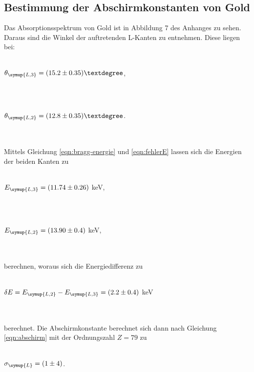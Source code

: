         \subsection{Bestimmung der Abschirmkonstanten von Gold}
        Das Absorptionsspektrum von Gold ist in Abbildung 7 des Anhanges zu sehen. Daraus sind die Winkel der auftretenden L-Kanten zu entnehmen.
        Diese liegen bei:
        \\ \\
        \centerline{$\theta_{\symup{L,3}} = (15.2 \pm 0.35)°$,}
        \\ \\
        \centerline{$\theta_{\symup{L,2}} = (12.8 \pm 0.35)°$.}
        \\ \\
        Mittels Gleichung \eqref{eqn:bragg-energie} und \eqref{eqn:fehlerE} lassen sich die Energien der beiden Kanten zu
        \\ \\
        \centerline{$E_{\symup{L,3}} = (11.74 \pm 0.26)$ keV,}
        \\ \\
        \centerline{$E_{\symup{L,2}} = (13.90 \pm 0.4)$ keV,}
        \\ \\
        berechnen, woraus sich die Energiedifferenz zu
        \\ \\
        \centerline{$\delta E = E_{\symup{L,2}} - E_{\symup{L,3}} = (2.2 \pm 0.4)$ keV}
        \\ \\
        berechnet. Die Abschirmkonstante berechnet sich dann nach Gleichung \eqref{eqn:abschirm} mit der Ordnungszahl $Z = 79$ zu 
        \\ \\
        \centerline{$\sigma_{\symup{L}} = (1 \pm 4)$.}
        \\ \\
        



